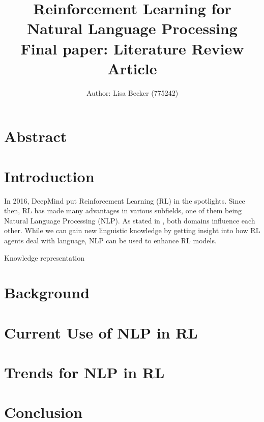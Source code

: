\documentclass[11pt,a4paper]{article}
\title{{\LARGE Reinforcement Learning for Natural Language Processing}\\[1.5mm]
{\large Final paper: Literature Review Article}\\[1.5mm]} %
\author{Author: Lisa Becker (775242) } %
\begin{document}
\maketitle

\section{Abstract}


\section{Introduction}
In 2016, DeepMind put Reinforcement Learning (RL) in the spotlights. Since then, RL has made many advantages in various subfields, one of them being Natural Language Processing (NLP). As stated in \citet{ijcai2019}, both domains influence each other. While we can gain new linguistic knowledge by getting insight into how RL agents deal with language, NLP can be used to enhance RL models. 

Knowledge representation

\section{Background}

\section{Current Use of NLP in RL}

\section{Trends for NLP in RL}

\section{Conclusion}

\newpage

\end{document}
